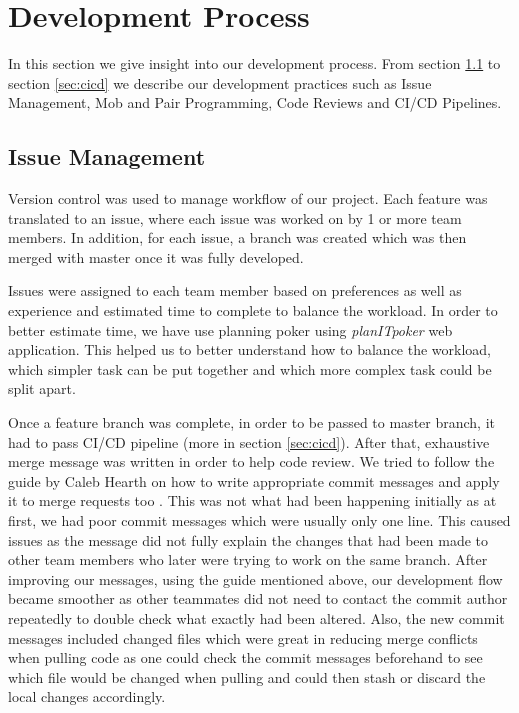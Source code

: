 \documentclass{l3proj}
\begin{document}
\newpage
\section{Development Process}
\label{sec:dev_process}
    In this section we give insight into our development process. 
    From section \ref{sec:version_control} to section \ref{sec:cicd} we describe our development practices such as Issue Management, Mob and Pair Programming, Code Reviews and CI/CD Pipelines.
        
    \subsection{Issue Management}
    \label{sec:version_control}
        Version control was used to manage workflow of our project. Each feature was translated to an issue, where each issue was worked on by 1 or more team members. In addition, for each issue, a branch was created which was then merged with master once it was fully developed.

        Issues were assigned to each team member based on preferences as well as experience and estimated time to complete to balance the workload. In order to better estimate time, we have use planning poker using \textit{planITpoker} \cite{poker} web application. This helped us to better understand how to balance the workload, which simpler task can be put together and which more complex task could be split apart.

        Once a feature branch was complete, in order to be passed to master branch, it had to pass CI/CD pipeline (more in section \ref{sec:cicd}). After that, exhaustive merge message was written in order to help code review. We tried to follow the guide by Caleb Hearth on how to write appropriate commit messages and apply it to merge requests too \cite{commit}. This was not what had been happening initially as at first, we had poor commit messages which were usually only one line. This caused issues as the message did not fully explain the changes that had been made to other team members who later were trying to work on the same branch. After improving our messages, using the guide mentioned above, our development flow became smoother as other teammates did not need to contact the commit author repeatedly to double check what exactly had been altered. Also, the new commit messages included changed files which were great in reducing merge conflicts when pulling code as one could check the commit messages beforehand to see which file would be changed when pulling and could then stash or discard the local changes accordingly.
\end{document}
